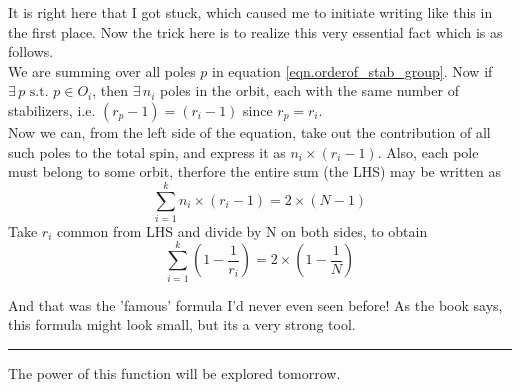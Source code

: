 \documentclass[12pt]{article}
\begin{document}
\par
It is right here that I got stuck, which caused me to initiate writing like this in the first place. Now the trick here is to realize this very essential fact which is as follows.\\
We are summing over all poles $p$ in equation \ref{eqn.orderof_stab_group}. Now if $\exists\,p \text{   s.t. } p \in O_{i}$, then $\exists\,n_{i}$ poles in the orbit, each with the same number of stabilizers, i.e. $(r_{p} - 1) = (r_{i} -1)$ since $r_{p}=r_{i}$.\\ 
Now we can, from the left side of the equation, take out the contribution of all such poles to the total spin, and express it as $n_{i} \times (r_{i}-1)$. Also, each pole must belong to some orbit, therfore the entire sum (the LHS) may be written as
\begin{equation}
\sum\limits_{i=1}^{k} n_{i} \times (r_{i}-1) = 2 \times (N - 1)
\label{eqn.D}
\end{equation}
Take $r_{i}$ common from LHS and divide by N on both sides, to obtain
\begin{equation}
\sum\limits_{i=1}^{k} (1 - \frac{1}{r_{i}}) = 2 \times (1 - \frac{1}{N})
\label{eqn.E}
\end{equation}
\par
And that was the 'famous' formula I'd never even seen before! As the book says, this formula might look small, but its a very strong tool.\\
\hrule
\par
The power of this function will be explored tomorrow.



\end{document}
